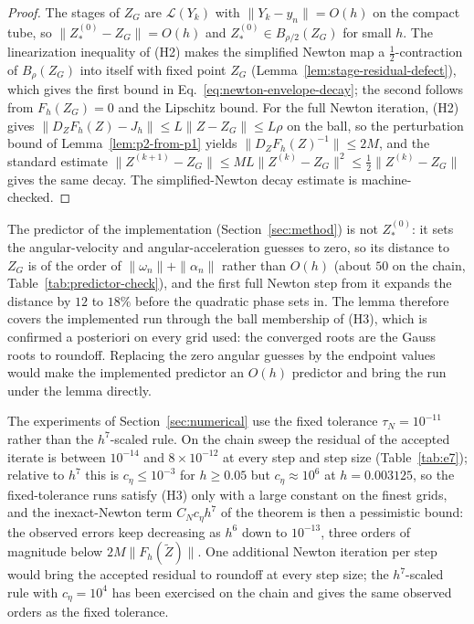 \documentclass[preprint,12pt]{elsarticle}
\begin{document}
\begin{proof}
The stages of $Z_G$ are $\mathcal L(Y_k)$ with $\|Y_k-y_n\|=O(h)$ on the compact tube, so
$\|Z^{(0)}_\ast-Z_G\|=O(h)$ and $Z^{(0)}_\ast\in B_{\rho/2}(Z_G)$ for small $h$. The linearization
inequality of (H2) makes the simplified Newton map a $\tfrac12$-contraction of $B_\rho(Z_G)$ into
itself with fixed point $Z_G$ (Lemma~\ref{lem:stage-residual-defect}), which gives the first bound
in Eq.~\eqref{eq:newton-envelope-decay}; the second follows from $F_h(Z_G)=0$ and the Lipschitz
bound. For the full Newton iteration, (H2) gives $\|D_ZF_h(Z)-J_h\|\le L\|Z-Z_G\|\le L\rho$ on the
ball, so the perturbation bound of Lemma~\ref{lem:p2-from-p1} yields $\|D_ZF_h(Z)^{-1}\|\le 2M$,
and the standard estimate $\|Z^{(k+1)}-Z_G\|\le ML\|Z^{(k)}-Z_G\|^2\le\tfrac12\|Z^{(k)}-Z_G\|$
gives the same decay. The simplified-Newton decay estimate is machine-checked.
\end{proof}

The predictor of the implementation (Section~\ref{sec:method}) is not $Z^{(0)}_\ast$: it sets the
angular-velocity and angular-acceleration guesses to zero, so its distance to $Z_G$ is of the
order of $\|\omega_n\|+\|\alpha_n\|$ rather than $O(h)$ (about $50$ on the chain,
Table~\ref{tab:predictor-check}), and the first full Newton step from it expands the distance by
$12$ to $18\%$ before the quadratic phase sets in. The lemma therefore covers the implemented run
through the ball membership of (H3), which is confirmed a posteriori on every grid used: the
converged roots are the Gauss roots to roundoff. Replacing the zero angular guesses by the endpoint
values would make the implemented predictor an $O(h)$ predictor and bring the run under the lemma
directly.

The experiments of Section~\ref{sec:numerical} use the fixed tolerance $\tau_N=10^{-11}$ rather
than the $h^7$-scaled rule. On the chain sweep the residual of the accepted iterate is between
$10^{-14}$ and $8\times10^{-12}$ at every step and step size (Table~\ref{tab:e7}); relative to
$h^7$ this is $c_\eta\le10^{-3}$ for $h\ge0.05$ but $c_\eta\approx10^{6}$ at $h=0.003125$, so
the fixed-tolerance runs satisfy (H3) only with a large constant on the finest grids, and the
inexact-Newton term $C_Nc_\eta h^7$ of the theorem is then a pessimistic bound: the observed errors
keep decreasing as $h^6$ down to $10^{-13}$, three orders of magnitude below $2M\|F_h(\widetilde Z)\|$.
One additional Newton iteration per step would bring the accepted residual to roundoff at every
step size; the $h^7$-scaled rule with $c_\eta=10^4$ has been exercised on the chain and gives the
same observed orders as the fixed tolerance.
\end{document}
